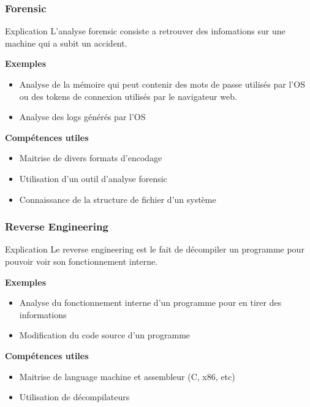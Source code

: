 \documentclass{beamer}
\begin{document}

\begin{frame}
\frametitle{Forensic}

\begin{block}{Explication}
    L'analyse forensic consiste a retrouver des infomations sur une machine qui a subit un accident. 
\end{block}

\pause

\textbf{Exemples}
\begin{itemize}
    \item Analyse de la mémoire qui peut contenir des mots de passe utilisés par l'OS ou des tokens de connexion utilisés par le navigateur web.
    \item Analyse des logs générés par l'OS
\end{itemize}

\pause

\textbf{Compétences utiles}
\begin{itemize}
    \item Maitrise de divers formats d'encodage
    \item Utilisation d'un outil d'analyse forensic
    \item Connaissance de la structure de fichier d'un système
\end{itemize}


\end{frame}


\begin{frame}
\frametitle{Reverse Engineering}

\begin{block}{Explication}
    Le reverse engineering est le fait de décompiler un programme pour pouvoir voir son fonctionnement interne.
\end{block}

\pause

\textbf{Exemples}
\begin{itemize}
    \item Analyse du fonctionnement interne d'un programme pour en tirer des informations
    \item Modification du code source d'un programme
\end{itemize}

\pause

\textbf{Compétences utiles}
\begin{itemize}
    \item Maitrise de language machine et assembleur (C, x86, etc)
    \item Utilisation de décompilateurs
\end{itemize}


\end{frame}
\end{document}
